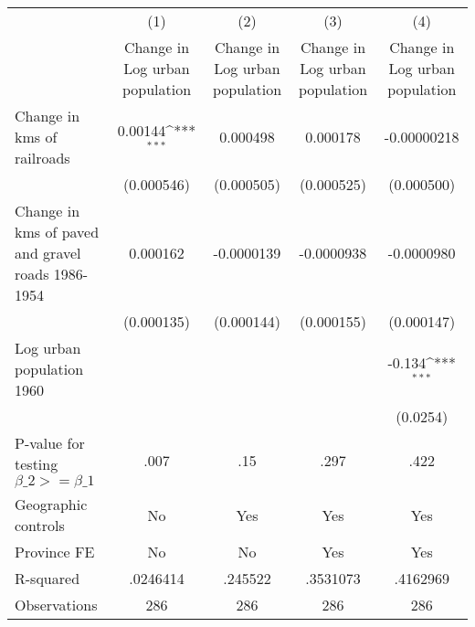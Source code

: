 {
\def\sym#1{\ifmmode^{#1}\else\(^{#1}\)\fi}
\begin{tabular}{l*{4}{c}}
\hline\hline
                &\multicolumn{1}{c}{(1)}&\multicolumn{1}{c}{(2)}&\multicolumn{1}{c}{(3)}&\multicolumn{1}{c}{(4)}\\
                &\multicolumn{1}{c}{Change in Log urban population}&\multicolumn{1}{c}{Change in Log urban population}&\multicolumn{1}{c}{Change in Log urban population}&\multicolumn{1}{c}{Change in Log urban population}\\
\hline
Change in kms of railroads&  0.00144\sym{***}& 0.000498         & 0.000178         &-0.00000218         \\
                &(0.000546)         &(0.000505)         &(0.000525)         &(0.000500)         \\
[1em]
Change in kms of paved and gravel roads 1986-1954& 0.000162         &-0.0000139         &-0.0000938         &-0.0000980         \\
                &(0.000135)         &(0.000144)         &(0.000155)         &(0.000147)         \\
[1em]
Log urban population 1960&                  &                  &                  &   -0.134\sym{***}\\
                &                  &                  &                  & (0.0254)         \\
\hline
P-value for testing $\beta\_{2} >= \beta\_{1}$&     .007         &      .15         &     .297         &     .422         \\
Geographic controls&       No         &      Yes         &      Yes         &      Yes         \\
Province FE     &       No         &       No         &      Yes         &      Yes         \\
R-squared       & .0246414         &  .245522         & .3531073         & .4162969         \\
Observations    &      286         &      286         &      286         &      286         \\
\hline\hline
\end{tabular}
}
